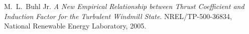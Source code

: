  M.~L.~Buhl Jr. \emph{A New Empirical Relationship between
  Thrust Coefficient and Induction Factor for the Turbulent Windmill State}. NREL/TP-500-36834,
  National Renewable Energy Laboratory, 2005.
